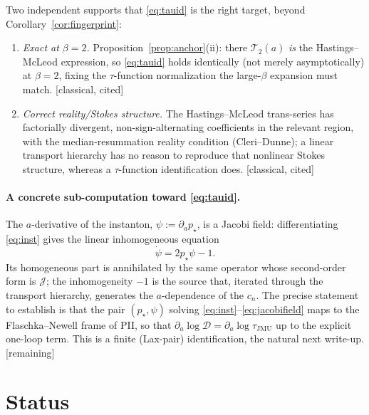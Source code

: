 \documentclass[11pt,reqno]{amsart}
\theoremstyle{plain}
\theoremstyle{remark}
\newcommand{\pinst}{p_\star}
\newcommand{\cited}{{\footnotesize\textsf{[classical, cited]}}}
\newcommand{\gap}{{\footnotesize\textsf{[remaining]}}}
\begin{document}
Two independent supports that \eqref{eq:tauid} is the right target, beyond
Corollary~\ref{cor:fingerprint}:
\begin{enumerate}
\item[(S1)] \emph{Exact at $\beta=2$.} Proposition~\ref{prop:anchor}(ii): there
$\mathcal T_2(a)$ \emph{is} the Hastings--McLeod expression, so \eqref{eq:tauid} holds identically
(not merely asymptotically) at $\beta=2$, fixing the $\tau$-function normalization the large-$\beta$
expansion must match. \cited
\item[(S2)] \emph{Correct reality/Stokes structure.} The Hastings--McLeod trans-series has
factorially divergent, non-sign-alternating coefficients in the relevant region, with the
median-resummation reality condition (Cleri--Dunne); a linear transport hierarchy has no reason to
reproduce that nonlinear Stokes structure, whereas a $\tau$-function identification does. \cited
\end{enumerate}

\paragraph{A concrete sub-computation toward \eqref{eq:tauid}.}
The $a$-derivative of the instanton, $\psi:=\partial_a\pinst$, is a Jacobi field: differentiating
\eqref{eq:inst} gives the linear inhomogeneous equation
\begin{equation}\label{eq:jacobifield}
\dot\psi=2\pinst\psi-1.
\end{equation}
Its homogeneous part is annihilated by the same operator whose second-order form is
$\mathcal J$; the inhomogeneity $-1$ is the source that, iterated through the transport hierarchy,
generates the $a$-dependence of the $c_n$. The precise statement to establish is that the pair
$(\pinst,\psi)$ solving \eqref{eq:inst}--\eqref{eq:jacobifield} maps to the Flaschka--Newell frame
of PII, so that $\partial_a\log\mathcal D=\partial_a\log\tau_{\mathrm{JMU}}$ up to the explicit
one-loop term. This is a finite (Lax-pair) identification, the natural next write-up. \gap

\section{Status}
\end{document}
